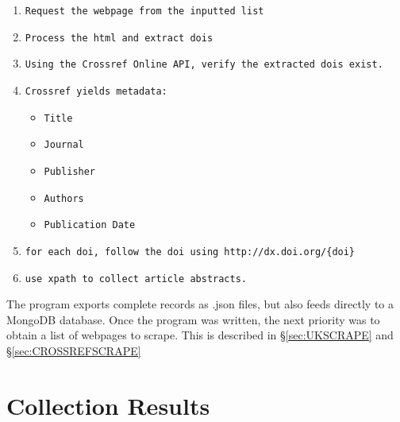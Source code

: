 \begin{sloppypar}
\begin{enumerate}
\item \texttt{Request the webpage from the inputted list}
\item \texttt{Process the html and extract dois}
\item \texttt{Using the Crossref Online API, verify the extracted dois exist.}
\item \texttt{Crossref yields metadata:}
\begin{itemize}
\item \texttt{Title}
\item \texttt{Journal}
\item \texttt{Publisher}
\item \texttt{Authors}
\item \texttt{Publication Date}
\end{itemize}
\item \texttt{for each doi, follow the doi using \texttt{http://dx.doi.org/\{doi\}}}
\item \texttt{use xpath to collect article abstracts.}
\end{enumerate}
\end{sloppypar}
The program exports complete records as .json files, but also feeds directly to a MongoDB database. Once the program was written, the next priority was to obtain a list of webpages to scrape. This is described in  \S\ref{sec:UKSCRAPE} and \S\ref{sec:CROSSREFSCRAPE} 
\section{Collection Results}

